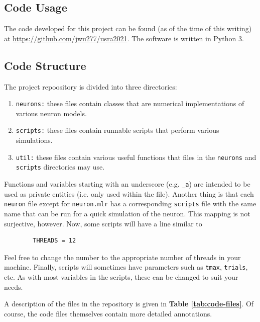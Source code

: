 \documentclass[letterpaper,12pt]{article}
\numberwithin{table}{section}
\numberwithin{figure}{section}
\numberwithin{equation}{section}
\newcommand{\reftab}[1]{\textbf{Table \ref{#1}}}
\begin{document}
\begin{flushleft}
    \section{Code Usage}

    The code developed for this project can be found (as of the time of this writing) at \url{https://github.com/jwu277/usra2021}. The software is written in Python 3.

    \subsection{Code Structure}

    The project repoository is divided into three directories:
    \begin{enumerate}
        \item \texttt{neurons:} these files contain classes that are numerical implementations of various neuron models.
        \item \texttt{scripts:} these files contain runnable scripts that perform various simulations.
        \item \texttt{util:} these files contain various useful functions that files in the \texttt{neurons} and \texttt{scripts} directories may use.
    \end{enumerate}

    Functions and variables starting with an underscore (e.g. \texttt{\_a}) are intended to be used as private entities (i.e. only used within the file). Another thing is that each \texttt{neuron} file except for \texttt{neuron.mlr} has a corresponding \texttt{scripts} file with the same name that can be run for a quick simulation of the neuron. This mapping is not surjective, however. Now, some scripts will have a line similar to
    \begin{lstlisting}
        THREADS = 12
    \end{lstlisting}
    Feel free to change the number to the appropriate number of threads in your machine. Finally, scripts will sometimes have parameters such as \texttt{tmax}, \texttt{trials}, etc. As with most variables in the scripts, these can be changed to suit your needs.

    A description of the files in the repository is given in \reftab{tab:code-files}. Of course, the code files themselves contain more detailed annotations.
    
    \begin{center}
    

\end{center}
\end{flushleft}
\end{document}
